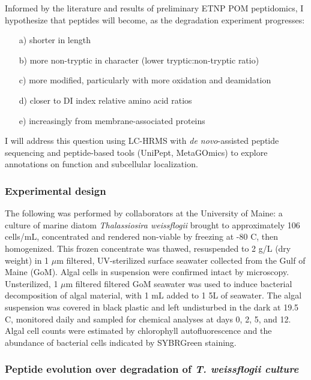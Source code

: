 \documentclass[12pt, letterpaper, twoside]{article}
\begin{document}
Informed by the literature and results of preliminary ETNP POM peptidomics, I hypothesize that peptides will become, as the degradation experiment progresses:

\bigskip

\renewcommand{\labelenumi}{\alph{enumi}}
\begin{enumerate}
	\item[a)] shorter in length
	\item[b)] more non-tryptic in character (lower tryptic:non-tryptic ratio)
	\item[c)] more modified, particularly with more oxidation and deamidation
	\item[d)] closer to DI index relative amino acid ratios
	\item[e)] increasingly from membrane-associated proteins
\end{enumerate}

\bigskip

I will address this question using LC-HRMS with \textit{de novo}-assisted peptide sequencing and peptide-based tools (UniPept, MetaGOmics) to explore annotations on function and subcellular localization.

\subsubsection{Experimental design}

The following was performed by collaborators at the University of Maine: a culture of marine diatom \textit{Thalassiosira weissflogii} brought to approximately 106 cells/mL, concentrated and rendered non-viable by freezing at  -80 C, then homogenized. This frozen concentrate was thawed, resuspended to 2 g/L (dry weight) in 1 $ \mu $m filtered, UV-sterilized surface seawater collected from the Gulf of Maine (GoM). Algal cells in suspension were confirmed intact by microscopy. Unsterilized, 1 $ \mu $m filtered filtered GoM seawater was used to induce bacterial decomposition of algal material, with 1  mL added to 1 5L of seawater. The algal suspension was covered in black plastic and left undisturbed in the dark at 19.5 C, monitored daily and sampled for chemical analyses at days 0, 2, 5, and 12. Algal cell counts were estimated by chlorophyll autofluorescence and the abundance of bacterial cells indicated by SYBRGreen staining. 


\subsubsection{Peptide evolution over degradation of \textit{T. weissflogii culture}}
\end{document}
